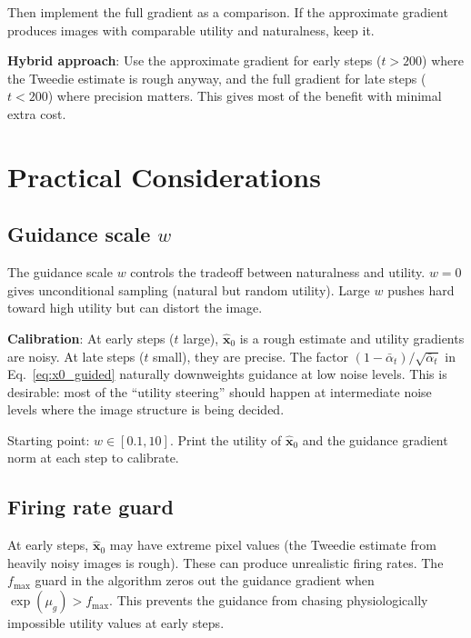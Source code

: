 \documentclass[11pt]{article}
\newcommand{\xb}{\mathbf{x}}
\newcommand{\alphabar}{\bar{\alpha}}
\begin{document}
Then implement the full gradient as a comparison. If the approximate gradient
produces images with comparable utility and naturalness, keep it.

\textbf{Hybrid approach}: Use the approximate gradient for early steps ($t > 200$)
where the Tweedie estimate is rough anyway, and the full gradient for late steps ($t < 200$)
where precision matters. This gives most of the benefit with minimal extra cost.

\section{Practical Considerations}
\label{sec:practical}

\subsection{Guidance scale $w$}

The guidance scale $w$ controls the tradeoff between naturalness and utility.
$w = 0$ gives unconditional sampling (natural but random utility).
Large $w$ pushes hard toward high utility but can distort the image.

\textbf{Calibration}: At early steps ($t$ large), $\hat{\xb}_0$ is a rough estimate
and utility gradients are noisy. At late steps ($t$ small), they are precise.
The factor $(1-\alphabar_t)/\sqrt{\alphabar_t}$ in Eq.~\eqref{eq:x0_guided} naturally
downweights guidance at low noise levels. This is desirable: most of the ``utility steering''
should happen at intermediate noise levels where the image structure is being decided.

Starting point: $w \in [0.1, 10]$. Print the utility of $\hat{\xb}_0$ and the guidance
gradient norm at each step to calibrate.

\subsection{Firing rate guard}

At early steps, $\hat{\xb}_0$ may have extreme pixel values (the Tweedie estimate from
heavily noisy images is rough). These can produce unrealistic firing rates.
The $f_{\max}$ guard in the algorithm zeros out the guidance gradient when
$\exp(\mu_g) > f_{\max}$. This prevents the guidance from chasing
physiologically impossible utility values at early steps.
\end{document}
